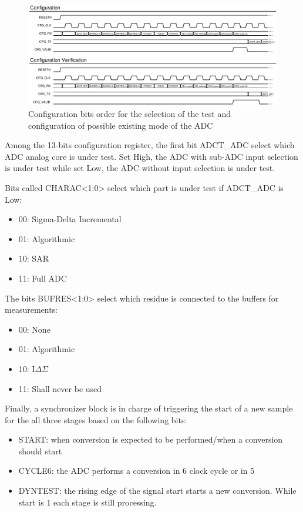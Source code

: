 \begin{figure}[htp]
    \centering
    \includegraphics[width=\textwidth]{Chapter5/Figs/adc_chip/ADC_CFG_SPI.ps}
    \caption{Configuration bits order for the selection of the test and configuration of possible existing mode of the ADC}
    \label{fig:adc-test-config-link}
\end{figure}

Among the 13-bits configuration register, the first bit ADCT\_ADC select which ADC analog core is under test. Set High, the ADC with sub-ADC input selection is under test while set Low, the ADC without input selection is under test.

Bits called CHARAC<1:0> select which part is under test if ADCT\_ADC is Low:
\begin{itemize}
    \item 00: Sigma-Delta Incremental
    \item 01: Algorithmic
    \item 10: SAR
    \item 11: Full ADC
\end{itemize}

The bits BUFRES<1:0> select which residue is connected to the buffers for measurements:
\begin{itemize}
    \item 00: None
    \item 01: Algorithmic
    \item 10: I\(\Delta \Sigma\)
    \item 11: Shall never be used
\end{itemize}

Finally, a synchronizer block is in charge of triggering the start of a new sample for the all three stages based on the following bits:
\begin{itemize}
    \item START: when conversion is expected to be performed/when a conversion should start
    \item CYCLE6: the ADC performs a conversion in 6 clock cycle or in 5
    \item DYNTEST: the rising edge of the signal start starts a new conversion. While start is 1 each stage is still processing.
\end{itemize}

